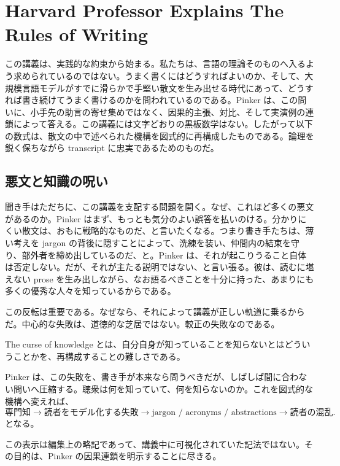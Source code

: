 \chapter{Harvard Professor Explains The Rules of Writing}

この講義は、実践的な約束から始まる。私たちは、言語の理論そのものへ入るよう求められているのではない。うまく書くにはどうすればよいのか、そして、大規模言語モデルがすでに滑らかで手堅い散文を生み出せる時代にあって、どうすれば書き続けてうまく書けるのかを問われているのである。Pinker は、この問いに、小手先の助言の寄せ集めではなく、因果的主張、対比、そして実演例の連鎖によって答える。この講義には文字どおりの黒板数学はない。したがって以下の数式は、散文の中で述べられた機構を図式的に再構成したものである。論理を鋭く保ちながら transcript に忠実であるためのものだ。

\section{悪文と知識の呪い}

聞き手はただちに、この講義を支配する問題を開く。なぜ、これほど多くの悪文があるのか。Pinker はまず、もっとも気分のよい誤答を払いのける。分かりにくい散文は、おもに戦略的なものだ、と言いたくなる。つまり書き手たちは、薄い考えを jargon の背後に隠すことによって、洗練を装い、仲間内の結束を守り、部外者を締め出しているのだ、と。Pinker は、それが起こりうること自体は否定しない。だが、それが主たる説明ではない、と言い張る。彼は、読むに堪えない prose を生み出しながら、なお語るべきことを十分に持った、あまりにも多くの優秀な人々を知っているからである。

この反転は重要である。なぜなら、それによって講義が正しい軌道に乗るからだ。中心的な失敗は、道徳的な芝居ではない。較正の失敗なのである。

\begin{definition}
The curse of knowledge とは、自分自身が知っていることを知らないとはどういうことかを、再構成することの難しさである。
\end{definition}

Pinker は、この失敗を、書き手が本来なら問うべきだが、しばしば間に合わない問いへ圧縮する。聴衆は何を知っていて、何を知らないのか。これを図式的な機構へ変えれば、
\begin{equation}
\text{専門知} \to \text{読者をモデル化する失敗} \to \text{jargon / acronyms / abstractions} \to \text{読者の混乱}.
\end{equation}
となる。

\begin{remark}
この表示は編集上の略記であって、講義中に可視化されていた記法ではない。その目的は、Pinker の因果連鎖を明示することに尽きる。
\end{remark}


